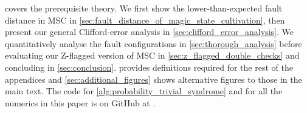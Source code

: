  covers the prerequisite theory.
We first show the lower-than-expected fault distance in MSC
in \cref{sec:fault_distance_of_magic_state_cultivation},
then present our general Clifford-error analysis in \cref{sec:clifford_error_analysis}.
We quantitatively analyse the fault configurations in \cref{sec:thorough_analysis}
before evaluating our Z-flagged version of MSC in \cref{sec:z_flagged_double_checks}
and concluding in \cref{sec:conclusion}.
 provides definitions
required for the rest of the appendices
and \cref{sec:additional_figures} shows alternative figures to those in the main text.
The code for \cref{alg:probability_trivial_syndrome}
and for all the numerics in this paper
is on GitHub at \cite{Chan2026c_quantum_bibstyle}.